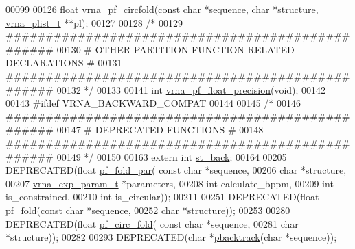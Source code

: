 \begin{DoxyCode}
00099 
00126 \textcolor{keywordtype}{float} \hyperlink{group__pf__fold_ga0175db86e506900c6b1a42fd41562e34}{vrna\_pf\_circfold}(\textcolor{keyword}{const} \textcolor{keywordtype}{char} *sequence, \textcolor{keywordtype}{char} *structure, 
      \hyperlink{group__data__structures_structvrna__plist__s}{vrna\_plist\_t} **pl);
00127 
00128 \textcolor{comment}{/*}
00129 \textcolor{comment}{#################################################}
00130 \textcolor{comment}{# OTHER PARTITION FUNCTION RELATED DECLARATIONS #}
00131 \textcolor{comment}{#################################################}
00132 \textcolor{comment}{*/}
00133 
00141 \textcolor{keywordtype}{int} \hyperlink{part__func_8h_ad2b3594f0b50b68029e0f54fdce59313}{vrna\_pf\_float\_precision}(\textcolor{keywordtype}{void});
00142 
00143 \textcolor{preprocessor}{#ifdef  VRNA\_BACKWARD\_COMPAT}
00144 
00145 \textcolor{comment}{/*}
00146 \textcolor{comment}{#################################################}
00147 \textcolor{comment}{# DEPRECATED FUNCTIONS                          #}
00148 \textcolor{comment}{#################################################}
00149 \textcolor{comment}{*/}
00150 
00163 \textcolor{keyword}{extern}  \textcolor{keywordtype}{int} \hyperlink{group__subopt__stochbt_gacd79b1a570e6ad9be24cb11fe8cae30a}{st\_back};
00164 
00205 DEPRECATED(\textcolor{keywordtype}{float}   \hyperlink{group__pf__fold_gac4f95bee734b2563a3d6e9932117ebdf}{pf\_fold\_par}(  \textcolor{keyword}{const} \textcolor{keywordtype}{char} *sequence,
00206                       \textcolor{keywordtype}{char} *structure,
00207                       \hyperlink{group__energy__parameters_structvrna__exp__param__s}{vrna\_exp\_param\_t} *parameters,
00208                       \textcolor{keywordtype}{int} calculate\_bppm,
00209                       \textcolor{keywordtype}{int} is\_constrained,
00210                       \textcolor{keywordtype}{int} is\_circular));
00211 
00251 DEPRECATED(\textcolor{keywordtype}{float}   \hyperlink{group__pf__fold_gadc3db3d98742427e7001a7fd36ef28c2}{pf\_fold}(\textcolor{keyword}{const} \textcolor{keywordtype}{char} *sequence,
00252                 \textcolor{keywordtype}{char} *structure));
00253 
00280 DEPRECATED(\textcolor{keywordtype}{float}   \hyperlink{group__pf__fold_ga819ce5fca8984004ac81c4a3b04cb735}{pf\_circ\_fold}( \textcolor{keyword}{const} \textcolor{keywordtype}{char} *sequence,
00281                       \textcolor{keywordtype}{char} *structure));
00282 
00293 DEPRECATED(\textcolor{keywordtype}{char}    *\hyperlink{group__subopt__stochbt_gac03ca6db186bb3bf0a2a326d7fb3ba03}{pbacktrack}(\textcolor{keywordtype}{char} *sequence));

\end{DoxyCode}
